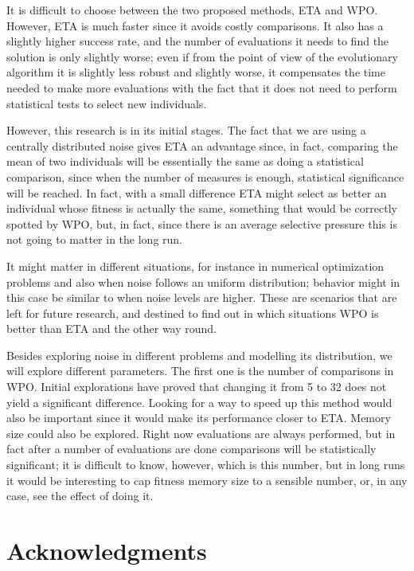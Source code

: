 \documentclass{llncs}
\begin{document}
It is difficult to choose between the two proposed methods, ETA and
WPO. However, ETA is much faster since it avoids costly
comparisons. It also has a slightly higher success rate, and the
number of evaluations it needs to find the solution is only slightly
worse; even if from the point of view of the evolutionary algorithm it
is slightly less robust and slightly worse, it compensates the time
needed to make more evaluations with the fact that it does not need to
perform statistical tests to select new individuals.

However, this research is in its initial stages. 
The fact that we are
using a centrally distributed noise gives ETA an advantage since, in
fact, comparing the mean of two individuals will be essentially the
same as doing a statistical comparison, since when the number of
measures is enough, statistical significance will be reached. In fact,
with a small difference ETA might select as better an individual whose
fitness is actually the same, something that would be correctly
spotted by WPO, but, in fact, since there is an average selective
pressure this is not going to matter in the long run. 

It might matter in different situations, for instance in numerical
optimization problems and also when noise follows an uniform
distribution; behavior might in this case be similar to when noise
levels are higher. These are scenarios that are left for future
research, and destined to find out in which situations WPO is better
than ETA and the other way round. 

Besides exploring noise in different problems and modelling its
distribution, we will explore different parameters. The first one is the number of comparisons in WPO. Initial
explorations have proved that changing it from 5 to 32 does not yield
a significant difference. Looking for a way to speed up this method
would also be important since it would make its performance closer to
ETA. Memory size could also be explored. Right now evaluations are
always performed, but in fact after a number of evaluations are done
comparisons will be statistically significant; it is difficult to
know, however, which is this number, but in long runs it would be
interesting to cap fitness memory size to a sensible number, or, in
any case, see the effect of doing it. 


\section*{Acknowledgments} %
\end{document}
